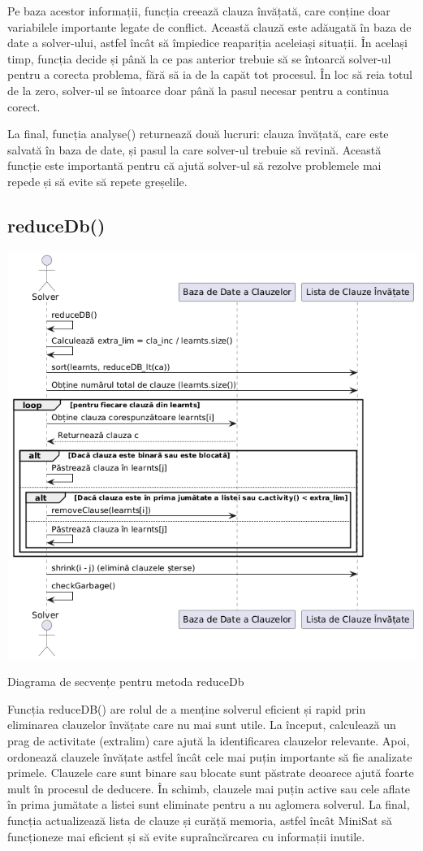 \documentclass[runningheads]{llncs}
\begin{document}
Pe baza acestor informații, funcția creează clauza învățată, care conține doar variabilele importante legate de conflict. Această clauză este adăugată în baza de date a solver-ului, astfel încât să împiedice reapariția aceleiași situații. În același timp, funcția decide și până la ce pas anterior trebuie să se întoarcă solver-ul pentru a corecta problema, fără să ia de la capăt tot procesul. În loc să reia totul de la zero, solver-ul se întoarce doar până la pasul necesar pentru a continua corect.

La final, funcția analyse() returnează două lucruri: clauza învățată, care este salvată în baza de date, și pasul la care solver-ul trebuie să revină. Această funcție este importantă pentru că ajută solver-ul să rezolve problemele mai repede și să evite să repete greșelile.

\subsection{reduceDb()}
\begin{center}
    \includegraphics[width=1.0\textwidth]{images/diagrams/pseudo_code/reduceDb_romana.png}
       \caption{Diagrama de secvențe pentru metoda reduceDb}
\end{center}
Funcția reduceDB() are rolul de a menține solverul eficient și rapid prin eliminarea clauzelor învățate care nu mai sunt utile. La început, calculează un prag de activitate (extra\underline{}lim) care ajută la identificarea clauzelor relevante. Apoi, ordonează clauzele învățate astfel încât cele mai puțin importante să fie analizate primele. Clauzele care sunt binare sau blocate sunt păstrate deoarece ajută foarte mult în procesul de deducere. În schimb, clauzele mai puțin active sau cele aflate în prima jumătate a listei sunt eliminate pentru a nu aglomera solverul. La final, funcția actualizează lista de clauze și curăță memoria, astfel încât MiniSat să funcționeze mai eficient și să evite supraîncărcarea cu informații inutile.
\end{document}
